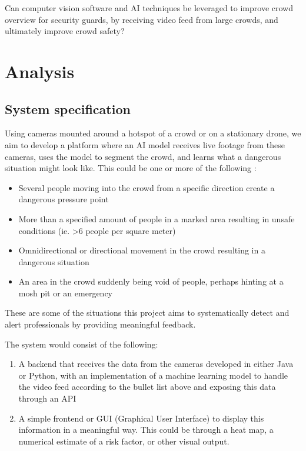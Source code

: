 \documentclass[
]{article}
\providecommand{\tightlist}{%
  \setlength{\itemsep}{0pt}\setlength{\parskip}{0pt}}\usepackage{longtable,booktabs,array}
\begin{document}
Can computer vision software and AI techniques be leveraged to improve
crowd overview for security guards, by receiving video feed from large
crowds, and ultimately improve crowd safety?

\newpage{}

\hypertarget{analysis}{%
\section{Analysis}\label{analysis}}

\hypertarget{system-specification}{%
\subsection{System specification}\label{system-specification}}

Using cameras mounted around a hotspot of a crowd or on a stationary
drone, we aim to develop a platform where an AI model receives live
footage from these cameras, uses the model to segment the crowd, and
learns what a dangerous situation might look like. This could be one or
more of the following \autocite{inproceedings}:

\begin{itemize}
\tightlist
\item
  Several people moving into the crowd from a specific direction create
  a dangerous pressure point
\item
  More than a specified amount of people in a marked area resulting in
  unsafe conditions (ie. \textgreater6 people per square meter)
\item
  Omnidirectional or directional movement in the crowd resulting in a
  dangerous situation
\item
  An area in the crowd suddenly being void of people, perhaps hinting at
  a mosh pit or an emergency
\end{itemize}

These are some of the situations this project aims to systematically
detect and alert professionals by providing meaningful feedback.

The system would consist of the following:

\begin{enumerate}
\def\labelenumi{\arabic{enumi}.}
\tightlist
\item
  A backend that receives the data from the cameras developed in either
  Java or Python, with an implementation of a machine learning model to
  handle the video feed according to the bullet list above and exposing
  this data through an API
\item
  A simple frontend or GUI (Graphical User Interface) to display this
  information in a meaningful way. This could be through a heat map, a
  numerical estimate of a risk factor, or other visual output.
\end{enumerate}
\end{document}
